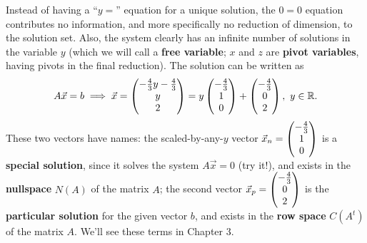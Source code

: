 \documentclass[10pt]{article}
\begin{document}
Instead of having a ``$y = $'' equation for a unique solution, the $0 = 0$ equation contributes no information, and more specifically no reduction of dimension, to the solution set. Also, the system clearly has an infinite number of solutions in the variable $y$ (which we will call a \textbf{free variable}; $x$ and $z$ are \textbf{pivot variables}, having pivots in the final reduction). The solution can be written as 
\[ A \vec{x} = b \implies \vec{x} = \begin{pmatrix} -\frac{4}{3}y - \frac{4}{3} \\ y \\ 2 \end{pmatrix} = y \begin{pmatrix} -\frac{4}{3} \\ 1 \\ 0 \end{pmatrix} + \begin{pmatrix} -\frac{4}{3} \\ 0 \\ 2 \end{pmatrix}, \,\, y \in \mathbb{R}. \]
These two vectors have names: the scaled-by-any-$y$ vector $\vec{x}_n = \begin{pmatrix} -\frac{4}{3} \\ 1 \\ 0 \end{pmatrix}$ is a \textbf{special solution}, since it solves the system $A \vec{x} = 0$ (try it!), and exists in the \textbf{nullspace} $N(A)$ of the matrix $A$; the second vector $\vec{x}_p = \begin{pmatrix} -\frac{4}{3} \\ 0 \\ 2 \end{pmatrix}$ is the \textbf{particular solution} for the given vector $b$, and exists in the \textbf{row space} $C(A^t)$ of the matrix $A$. We'll see these terms in Chapter 3.
\end{document}
